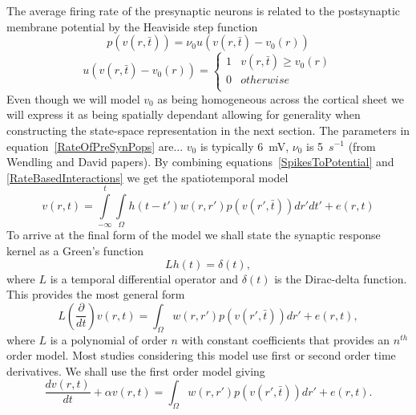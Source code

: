 \documentclass[onecolumn,draftcls]{IEEEtran}
\begin{document}
The average firing rate of the presynaptic neurons is related to the postsynaptic membrane potential by the Heaviside step function
\begin{equation}\label{RateOfPreSynPops}
p\left( {v\left( {r,\bar t} \right)} \right) = {\nu_0}u\left( {v\left( {r,\bar t} \right) - {v_0}\left( r \right)} \right)
\end{equation}
\begin{equation}\label{HeavisideDef}
u\left( {v\left( {r,\bar t} \right) - {v_0}\left( r \right)} \right) = \left\{ {\begin{array}{*{20}{c}}
   1 & {v\left( {r,\bar t} \right) \ge {v_0}\left( r \right)}  \\
   0 & {otherwise}  \\
\end{array}} \right.
\end{equation}
Even though we will model  $v_0$ as being homogeneous across the cortical sheet we will express it as being spatially dependant allowing for generality when constructing the state-space representation in the next section. The parameters in equation~\ref{RateOfPreSynPops} are... $v_0$ is typically 6~mV, $\nu_0$ is 5~$s^{-1}$ (from Wendling and David papers). By combining equations~\ref{SpikesToPotential} and \ref{RateBasedInteractions} we get the spatiotemporal model
\begin{equation}\label{FullDoubleIntModel}
v\left(r,t\right) = \int\limits_{-\infty}^t\int\limits_\Omega  h\left(t - t'\right)w\left(r,r'\right)p\left( v\left( r',\bar t \right)\right)dr' dt'+e\left(r,t\right)
\end{equation}
To arrive at the final form of the model we shall state the synaptic response kernel as a Green's function
\begin{equation}\label{GreensFuncDef}
Lh\left( t \right) = \delta \left( t \right),
\end{equation}
where $L$ is a temporal differential operator and $\delta(t)$ is the Dirac-delta function. This provides the most general form
\begin{equation}\label{GenForm}
L\left( {\frac{\partial }{{dt}}} \right)v\left( {r,t} \right) = \int_\Omega  {w\left( {r,r'} \right)p\left( {v\left( {r',\bar t} \right)} \right)dr'}  + e\left( {r,t} \right),
\end{equation}
where $L$ is a polynomial of order $n$ with constant coefficients that provides an $n^{th}$ order model. Most studies considering this model use first or second order time derivatives. We shall use the first order model giving
\begin{equation}\label{FinalForm1}
\frac{{dv\left( {r,t} \right)}}{{dt}} + \alpha{v\left( {r,t} \right)} = \int_\Omega  {w\left( {r,r'} \right)p\left( {v\left( {r',\bar t} \right)} \right)dr'}  +e\left( {r,t} \right).
\end{equation}
\end{document}
